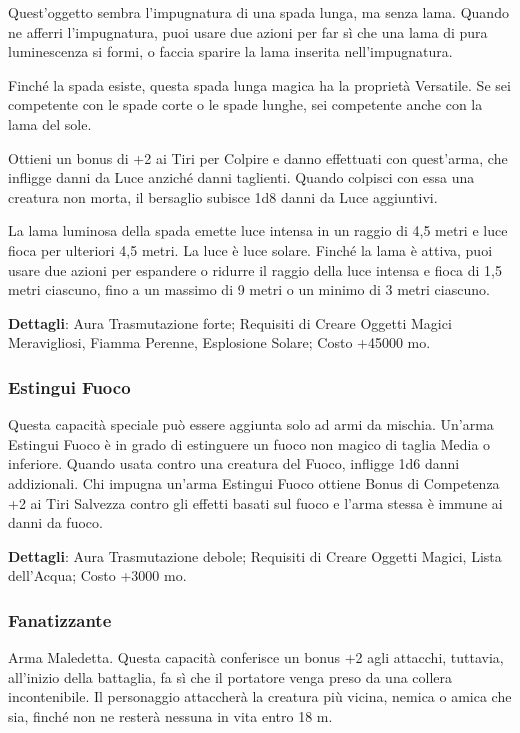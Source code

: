 \begin{multicols}{2}
	Quest'oggetto sembra l'impugnatura di una spada lunga, ma senza lama. Quando ne afferri l'impugnatura, puoi usare due azioni per far sì che una lama di pura luminescenza si formi, o faccia sparire la lama inserita nell'impugnatura.

	Finché la spada esiste, questa spada lunga magica ha la proprietà Versatile. Se sei competente con le spade corte o le spade lunghe, sei competente anche con la lama del sole.

	Ottieni un bonus di +2 ai Tiri per Colpire e danno effettuati con quest'arma, che infligge danni da Luce anziché danni taglienti. Quando colpisci con essa una creatura non morta, il bersaglio subisce 1d8 danni da Luce aggiuntivi.

	La lama luminosa della spada emette luce intensa in un raggio di 4,5 metri e luce fioca per ulteriori 4,5 metri. La luce è luce solare. Finché la lama è attiva, puoi usare due azioni per espandere o ridurre il raggio della luce intensa e fioca di 1,5 metri ciascuno, fino a un massimo di 9 metri o un minimo di 3 metri ciascuno.

	\textbf{Dettagli}: Aura Trasmutazione forte; Requisiti di Creare Oggetti Magici Meravigliosi, Fiamma Perenne, Esplosione Solare; Costo +45000 mo.

	\subsubsection*{Estingui Fuoco}

	Questa capacità speciale può essere aggiunta solo ad armi da mischia. Un'arma Estingui Fuoco è in grado di estinguere un fuoco non magico di taglia Media o inferiore. Quando usata contro una creatura del Fuoco, infligge 1d6 danni addizionali. Chi impugna un'arma Estingui Fuoco ottiene Bonus di Competenza +2 ai Tiri Salvezza contro gli effetti basati sul fuoco e l'arma stessa è immune ai danni da fuoco.

	\textbf{Dettagli}: Aura Trasmutazione debole; Requisiti di Creare Oggetti Magici, Lista dell'Acqua; Costo +3000 mo.

	\subsubsection*{Fanatizzante}

	Arma Maledetta. Questa capacità conferisce un bonus +2 agli attacchi, tuttavia, all’inizio della battaglia, fa sì che il portatore venga preso da una collera incontenibile. Il personaggio attaccherà la creatura più vicina, nemica o amica che sia, finché non ne resterà nessuna in vita entro 18 m.


\end{multicols}
